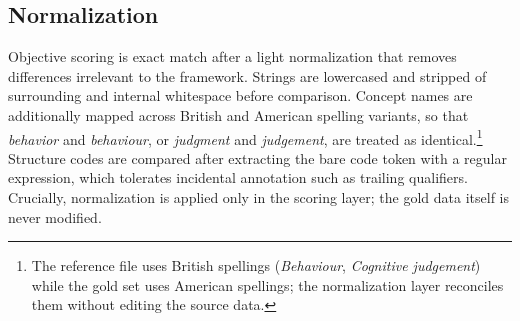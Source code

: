 \documentclass[onecolumn, 11pt]{IEEEtran}
\begin{document}
\subsection{Normalization}
Objective scoring is exact match after a light normalization that removes differences irrelevant to the framework. Strings are lowercased and stripped of surrounding and internal whitespace before comparison. Concept names are additionally mapped across British and American spelling variants, so that \emph{behavior} and \emph{behaviour}, or \emph{judgment} and \emph{judgement}, are treated as identical.\footnote{The reference file uses British spellings (\emph{Behaviour}, \emph{Cognitive judgement}) while the gold set uses American spellings; the normalization layer reconciles them without editing the source data.} Structure codes are compared after extracting the bare code token with a regular expression, which tolerates incidental annotation such as trailing qualifiers. Crucially, normalization is applied only in the scoring layer; the gold data itself is never modified.
\end{document}
